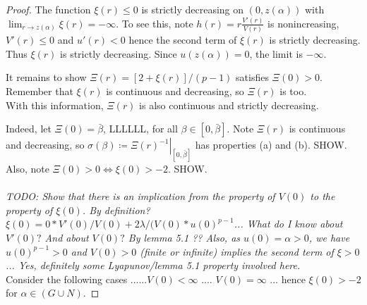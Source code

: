\begin{lemma}
\begin{proof}
The function $\xi(r)\leq0$ is strictly decreasing on $(0,z(\alpha))$ with $\lim_{r\to z(\alpha)}\xi(r)=-\infty$. {\color{red}To see this, note $h(r)=r\frac{V'(r)}{V(r)}$ is nonincreasing, $V'(r)\leq0$ and $u'(r)<0$ hence the second term of $\xi(r)$ is strictly decreasing. Thus $\xi(r)$ is strictly decreasing. Since $u(z(\alpha))=0$, the limit is $-\infty$.}

It remains to show $\Xi(r)=\left[2+\xi(r)\right]/(p-1)$ satisfies $\Xi(0)>0$. Remember that $\xi(r)$ is continuous and decreasing, so $\Xi(r)$ is too. \\

With this information, $\Xi(r)$ is also continuous and strictly decreasing.

Indeed, let $\Xi(0)=\bar\beta$, LLLLLL, for all $\beta\in[0,\bar\beta]$. Note $\Xi(r)$ is continuous and decreasing, so $\sigma(\beta)\coloneqq\left.\Xi(r)^{-1}\right|_{[0,\bar\beta]}$ has properties (a) and (b). SHOW. \\

Also, note $\Xi(0)>0\iff\xi(0)>-2$. SHOW.\\

\emph{}\\[11pt]\emph{TODO: Show that there is an implication from the property of $V(0)$ to the property of $\xi(0)$. By definition? $\xi(0) = 0 * V'(0)/V(0) + 2\lambda / (V(0)*u(0)^{p-1}$... What do I know about $V'(0)?$ And about $V(0)?$ By lemma 5.1 ?? Also, as $u(0)=\alpha>0$, we have $u(0)^{p-1}>0$ and $V(0)>0$ (finite or infinite) implies the second term of $\xi > 0$... Yes, definitely some Lyapunov/lemma 5.1 property involved here.}\\[11pt]
Consider the following cases ......$V(0)<\infty$ .... $V(0)=\infty$ ... hence $\xi(0)>-2$ for $\alpha\in(G\cup N)$.

\end{proof}
\end{lemma}
